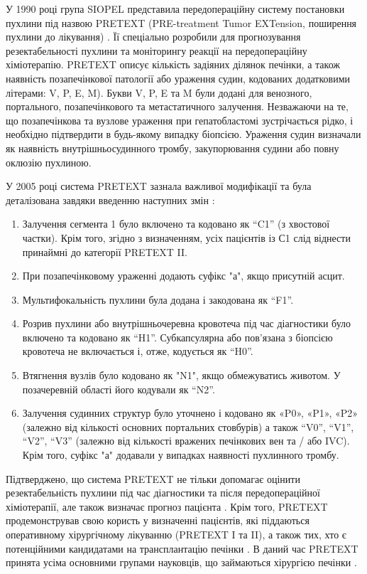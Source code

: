У 1990 році група SIOPEL представила передопераційну систему постановки пухлини під назвою PRETEXT (PRE-treatment Tumor EXTension, поширення пухлини до лікування) \cite{pmid28921939}. Її спеціально розробили для прогнозування резектабельності пухлини та моніторингу реакції на передопераційну хіміотерапію. PRETEXT описує кількість задіяних ділянок печінки, а також наявність позапечінкової патології або ураження судин, кодованих додатковими літерами: V, P, E, M). Букви V, P, E та M були додані для венозного, портального, позапечінкового та метастатичного залучення. Незважаючи на те, що позапечінкова та вузлове ураження при гепатобластомі зустрічається рідко, і необхідно  підтвердити в будь-якому випадку біопсією. Ураження судин визначали як наявність внутрішньосудинного тромбу, закупорювання судини або повну оклюзію пухлиною. 

У 2005 році система PRETEXT зазнала важливої модифікації та була деталізована завдяки введенню наступних змін \cite{pmid29286034}:

\begin{enumerate}
    \item Залучення сегмента 1 було включено та кодовано як “C1” (з хвостової частки). Крім того, згідно з визначенням, усіх пацієнтів із С1 слід віднести принаймні до категорії PRETEXT II.  
    \item При позапечінковому ураженні додають суфікс "а", якщо присутній асцит.
    \item Мультифокальність пухлини була додана і закодована як “F1”.
    \item Розрив пухлини або внутрішньочеревна кровотеча під час діагностики було включено та кодовано як “H1”. Субкапсулярна або пов’язана з біопсією кровотеча не включається і, отже, кодується як “H0”.
    \item Втягнення вузлів було кодовано як "N1", якщо обмежуватись животом. У позачеревній області його кодували як “N2”.
    \item Залучення судинних структур було уточнено і кодовано як «P0», «P1», «P2» (залежно від кількості основних портальних стовбурів) а також “V0”, “V1”, “V2”, “V3” (залежно від кількості вражених печінкових вен та / або IVC). Крім того, суфікс "а" додавали у випадках наявності пухлинного тромбу.
\end{enumerate}
\vspace{2em}

Підтверджено, що система PRETEXT не тільки допомагає оцінити резектабельність пухлини під час діагностики та після передопераційної хіміотерапії, але також визначає прогноз пацієнта \cite{pmid28203111}. Крім того, PRETEXT продемонстрував свою користь у визначенні пацієнтів, які піддаються оперативному хірургічному лікуванню (PRETEXT I та II), а також тих, хто є потенційними кандидатами на трансплантацію печінки \cite{pmid29341393}. В даний час PRETEXT принята усіма основними групами науковців, що займаються хірургією печінки \cite{pmid29375822}.

